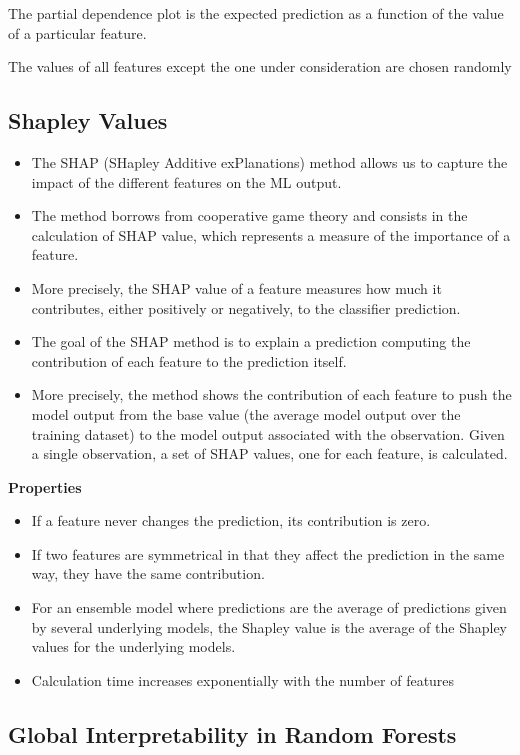 The partial dependence plot is the expected prediction as a function of the value of a particular feature.

The values of all features except the one under consideration are chosen randomly 

\subsection{Shapley Values}

\begin{itemize}
    \item The SHAP (SHapley Additive exPlanations) method allows us to capture the impact of the different features on the ML output. 
    \item The method borrows from cooperative game theory and consists in the calculation of SHAP value, which represents a measure of the importance of a feature. 
    \item More precisely, the SHAP value of a feature measures how much it contributes, either positively or negatively, to the classifier prediction.
    \item The goal of the SHAP method is to explain a prediction computing the contribution of each feature to the prediction itself.
    \item More precisely, the method shows the contribution of each feature to push the model output from the base value (the average model output over the training dataset) to the model output associated with the observation. Given a single observation, a set of SHAP values, one for each feature, is calculated.
\end{itemize}

\textbf{Properties}
\begin{itemize}
    \item If a feature never changes the prediction, its contribution is zero. 
    \item If two features are symmetrical in that they affect the prediction in the same way, they have the same contribution. 
    \item For an ensemble model where predictions are the average of predictions given by several underlying models, the Shapley value is the average of the Shapley values for the underlying models. 
    \item Calculation time increases exponentially with the number of features
\end{itemize}

\subsection{Global Interpretability in Random Forests}

